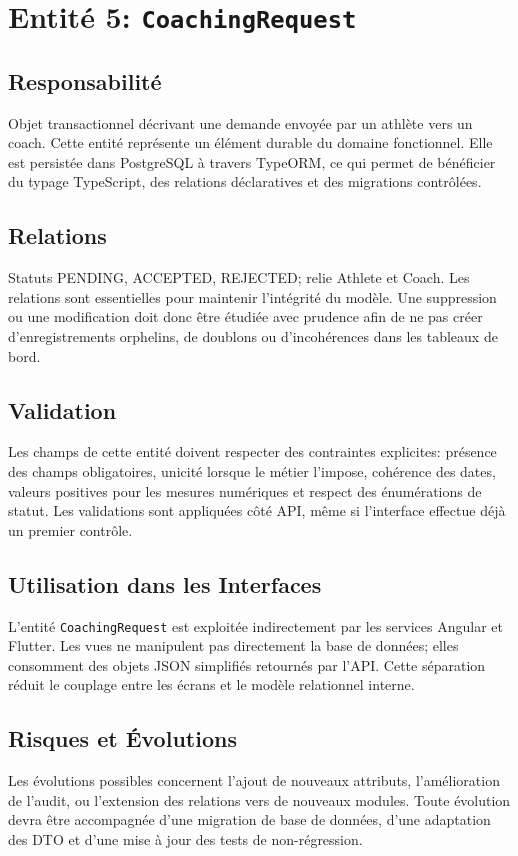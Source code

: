 \section{Entité 5: \texttt{CoachingRequest}}
\subsection{Responsabilité}
Objet transactionnel décrivant une demande envoyée par un athlète vers un coach. Cette entité représente un élément durable du domaine fonctionnel. Elle est persistée dans PostgreSQL à travers TypeORM, ce qui permet de bénéficier du typage TypeScript, des relations déclaratives et des migrations contrôlées.

\subsection{Relations}
Statuts PENDING, ACCEPTED, REJECTED; relie Athlete et Coach. Les relations sont essentielles pour maintenir l'intégrité du modèle. Une suppression ou une modification doit donc être étudiée avec prudence afin de ne pas créer d'enregistrements orphelins, de doublons ou d'incohérences dans les tableaux de bord.

\subsection{Validation}
Les champs de cette entité doivent respecter des contraintes explicites: présence des champs obligatoires, unicité lorsque le métier l'impose, cohérence des dates, valeurs positives pour les mesures numériques et respect des énumérations de statut. Les validations sont appliquées côté API, même si l'interface effectue déjà un premier contrôle.

\subsection{Utilisation dans les Interfaces}
L'entité \texttt{CoachingRequest} est exploitée indirectement par les services Angular et Flutter. Les vues ne manipulent pas directement la base de données; elles consomment des objets JSON simplifiés retournés par l'API. Cette séparation réduit le couplage entre les écrans et le modèle relationnel interne.

\subsection{Risques et Évolutions}
Les évolutions possibles concernent l'ajout de nouveaux attributs, l'amélioration de l'audit, ou l'extension des relations vers de nouveaux modules. Toute évolution devra être accompagnée d'une migration de base de données, d'une adaptation des DTO et d'une mise à jour des tests de non-régression.

